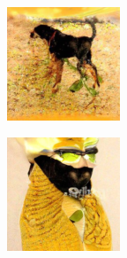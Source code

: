 \documentclass{article}
\begin{document}
\begin{figure}
\begin{subfigure}[b]{0.5\linewidth}
\begin{subfigure}[b]{0.242\linewidth}
        \end{subfigure}%
        \begin{subfigure}[b]{0.242\linewidth}
        \includegraphics[width=\linewidth]{figures/imagenet128/solver_samples/imagenet128_fm_ot_67_20.png}
        \end{subfigure}%
        \begin{subfigure}[b]{0.242\linewidth}
        \includegraphics[width=\linewidth]{figures/imagenet128/solver_samples/imagenet128_fm_ot_67_50.png}

\end{subfigure}
\end{subfigure}
\end{figure}
\end{document}
